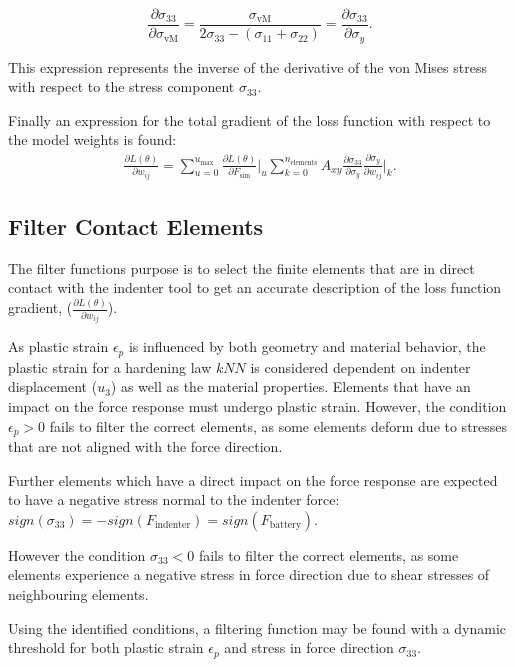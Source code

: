 \[
\frac{\partial \sigma_{33}}{\partial \sigma_{\text{vM}}} = 
\frac{\sigma_{\text{vM}}}{2\sigma_{33} - (\sigma_{11} + \sigma_{22})}
=    \frac{\partial \sigma_{33}}{\partial \sigma_y}.
\]

This expression represents the inverse of the derivative of the von Mises stress with respect to the stress component \(\sigma_{33}\).

Finally an expression for the total gradient of the loss function with respect to the model weights is found:
\begin{align*}
    \frac{\partial L(\theta)}{\partial w_{ij}}=
    \sum_{u=0}^{u_{\text{max}}}
    \frac{\partial L(\theta)}{\partial F_{\text{sim}}}\Big|_u
    \sum_{k=0}^{n_{\text{elements}}}
    A_{xy}
    \frac{\partial \sigma_{33}}{\partial \sigma_y}
    \frac{\partial \sigma_y}{\partial w_{ij}}\Big|_k.
\end{align*}


\subsection{Filter Contact Elements}
The filter functions purpose is to select the finite elements that are in direct contact with the indenter tool to get an accurate description of the loss function gradient, ($\frac{\partial L(\theta)}{\partial w_{ij}}$).

As plastic strain $\epsilon_p$ is influenced by both geometry and material behavior, the plastic strain for a hardening law $kNN$ is considered dependent on indenter displacement ($u_3$) as well as the material properties. Elements that have an impact on the force response must undergo plastic strain. However, the condition $\epsilon_p > 0$ fails to filter the correct elements, as some elements deform due to stresses that are not aligned with the force direction.

Further elements which have a direct impact on the force response are expected to have a negative stress normal to the indenter force: $sign(\sigma_{33}) = - sign(F_\text{indenter}) = sign(F_\text{battery})$.

However the condition $\sigma_{33} < 0$ fails to filter the correct elements, as some elements experience a negative stress in force direction due to shear stresses of neighbouring elements.

Using the identified conditions, a filtering function may be found with a dynamic threshold for both plastic strain $\epsilon_p$ and stress in force direction $\sigma_{33}$.

